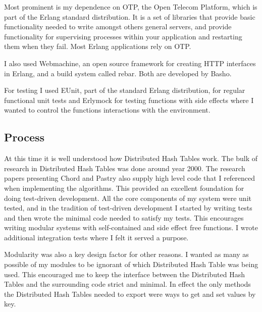 Most prominent is my dependence on OTP, the Open Telecom Platform, which is part of the Erlang standard distribution. It is a set of libraries that provide basic functionality needed to write amongst others general servers, and provide functionality for supervising processes within your application and restarting them when they fail. Most Erlang applications rely on OTP.

I also used Webmachine, an open source framework for creating HTTP interfaces in Erlang, and a build system called rebar. Both are developed by Basho.

For testing I used EUnit, part of the standard Erlang distribution, for regular functional unit tests and Erlymock for testing functions with side effects where I wanted to control the functions interactions with the environment.



\subsection{Process}
At this time it is well understood how Distributed Hash Tables work. The bulk of research in Distributed Hash Tables was done around year 2000. The research papers presenting Chord and Pastry also supply high level code that I referenced when implementing the algorithms. This provided an excellent foundation for doing test-driven development. All the core components of my system were unit tested, and in the tradition of test-driven development I started by writing tests and then wrote the minimal code needed to satisfy my tests. This encourages writing modular systems with self-contained and side effect free functions.
I wrote additional integration tests where I felt it served a purpose.

Modularity was also a key design factor for other reasons. I wanted as many as possible of my modules to be ignorant of which Distributed Hash Table was being used. This encouraged me to keep the interface between the Distributed Hash Tables and the surrounding code strict and minimal. In effect the only methods the Distributed Hash Tables needed to export were ways to get and set values by key.



